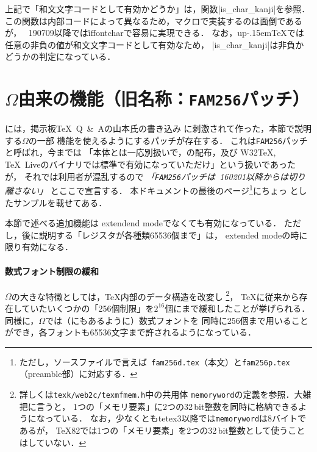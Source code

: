 \documentclass[a4paper,11pt,nomag,dvipdfmx]{jsarticle}
\newcommand{\OMEGA}{\texorpdfstring{$\Omega$}{Ω}}
\def\upTeX{u\pTeX}\def\pTeX{p\kern-.15em\TeX}
\begin{document}
\begin{dangerous}
  上記で「和文文字コードとして有効かどうか」は，関数|is_char_kanji|を参照．
  この関数は内部コードによって異なるため，マクロで実装するのは面倒であるが，
  \epTeX~190709以降では\.{iffontchar}で容易に実現できる．
  なお，\upTeX では任意の非負の値が和文文字コードとして有効なため，
  |is_char_kanji|は非負かどうかの判定になっている．
\end{dangerous}

\section{\OMEGA 由来の機能（旧名称：\texttt{FAM256}パッチ）}
\epTeX には，掲示板\TeX\ Q\ \&\ Aの山本氏の書き込み
\cite{yamamoto}に刺激されて作った，本節で説明する\OMEGA の一部
機能を使えるようにするパッチが存在する．
これは\texttt{FAM256}パッチと呼ばれ，今までは
「\epTeX 本体とは一応別扱いで，\epTeX の配布，及び
W32\TeX, \TeX~Liveのバイナリでは標準で有効になっていただけ」という扱いであったが，
それでは利用者が混乱するので
\emph{「\texttt{FAM256}パッチは\epTeX~160201以降からは切り離さない」}
とここで宣言する．
本ドキュメントの最後のページ\footnote{ただし，ソースファイルで言えば{\tt
fam256d.tex}（本文）と\texttt{fam256p.tex}（preamble部）に対応する．}にちょっ
としたサンプルを載せてある．

本節で述べる追加機能は extendend modeでなくても有効になっている．
ただし，後に説明する「レジスタが各種類65536個まで」は，
extended modeの時に限り有効になる．

\paragraph{数式フォント制限の緩和}
\OMEGA の大きな特徴としては，\TeX 内部のデータ構造を改変し
\footnote{詳しくは\texttt{texk/web2c/texmfmem.h}中の共用体%
\texttt{memoryword}の定義を参照．大雑把に言うと，
1つの「メモリ要素」に2つの32\,bit整数を同時に格納できるようになっている．
なお，少なくともtetex3以降では\texttt{memoryword}は8バイトであるが，
\TeX 82では1つの「メモリ要素」を2つの32\,bit整数として使うことはしていない．
}，
\TeX に従来から存在していたいくつかの「256個制限」を$2^{16}$個にまで緩和したことが挙げられる．
同様に，\OMEGA では（\cite{yamamoto}にもあるように）数式フォントを
同時に256個まで用いることができ，各フォントも65536文字まで許されるようになっている．

\medskip
\end{document}

